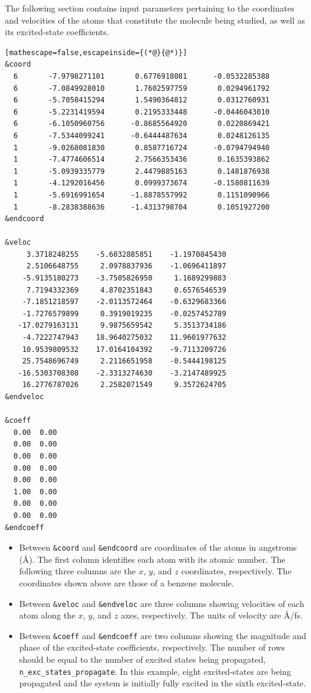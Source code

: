 \documentclass[letterpaper,12pt,titlepage]{article}
\begin{document}
The following section contains input parameters pertaining to the coordinates and velocities of the atoms that constitute the molecule being studied, as well as its excited-state coefficients.
\begin{lstlisting}[mathescape=false,escapeinside={(*@}{@*)}]
&coord
  6       -7.9798271101       0.6776918081      -0.0532285388
  6       -7.0849928010       1.7602597759       0.0294961792
  6       -5.7058415294       1.5490364812       0.0312760931
  6       -5.2231419594       0.2195333448      -0.0446043010
  6       -6.1050960756      -0.8685564920       0.0220869421
  6       -7.5344099241      -0.6444487634       0.0248126135
  1       -9.0268081830       0.8587716724      -0.0794794940
  1       -7.4774606514       2.7566353436       0.1635393862
  1       -5.0939335779       2.4479885163       0.1481876938
  1       -4.1292016456       0.0999373674      -0.1580811639
  1       -5.6916991654      -1.8878557992       0.1151090966
  1       -8.2838388636      -1.4313798704       0.1051927200
&endcoord

&veloc
     3.3718248255    -5.6032885851    -1.1970845430
     2.5106648755     2.0978837936    -1.0696411897
    -5.9135180273    -3.7505826950     1.1689299883
     7.7194332369     4.8702351843     0.6576546539
    -7.1851218597    -2.0113572464    -0.6329683366
    -1.7276579899     0.3919019235    -0.0257452789
   -17.0279163131     9.9875659542     5.3513734186
    -4.7222747943    18.9640275032    11.9601977632
    10.9539809532    17.0164104392    -9.7113209726
    25.7548696749     2.2116651958    -0.5444198125
   -16.5303708308    -2.3313274630    -3.2147489925
    16.2776787026     2.2582071549     9.3572624705
&endveloc

&coeff
  0.00  0.00
  0.00  0.00
  0.00  0.00
  0.00  0.00
  0.00  0.00
  1.00  0.00
  0.00  0.00
  0.00  0.00
&endcoeff
\end{lstlisting}
\begin{itemize}
\item Between \verb+&coord+ and \verb+&endcoord+ are coordinates of the atoms in angstroms (\AA).  The first column identifies each atom with its atomic number.  The following three columns are the $x$, $y$, and $z$ coordinates, respectively.  The coordinates shown above are those of a benzene molecule.
\item Between \verb+&veloc+ and \verb+&endveloc+ are three columns showing velocities of each atom along the $x$, $y$, and $z$ axes, respectively.  The units of velocity are \AA/fs. 
\item Between \verb+&coeff+ and \verb+&endcoeff+ are two columns showing the magnitude and phase of the excited-state coefficients, respectively.  The number of rows should be equal to the number of excited states being propagated, \verb+n_exc_states_propagate+.  In this example, eight excited-states are being propagated and the system is initially fully excited in the sixth excited-state. 
\end{itemize}
\end{document}
